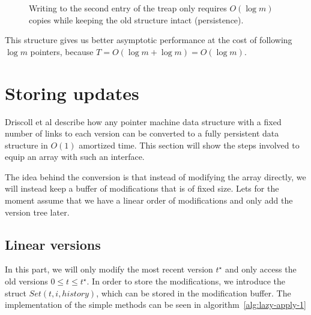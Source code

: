\documentclass[11pt]{Thesis}
\theoremstyle{definition}
\newcommand{\figlabel}[1]{\label{fig:#1}}
\begin{document}
\begin{figure}
\caption[Treap for history storage]{\figlabel{treap}Writing to the second entry of the treap only requires
$O(\log m)$ copies while keeping the old structure intact (persistence).}
\end{figure}

This structure gives us better asymptotic performance at the cost of 
following $\log m$ pointers, because $T = O(\log m + \log m) = O(\log m)$.

\section{Storing updates}
Driscoll et al\cite{Dris89a} describe how any pointer machine data structure 
with a fixed number of links to each version can be converted to a fully 
persistent data structure in $O(1)$ amortized time. This section will show 
the steps involved to equip an array with such an interface.

The idea behind the conversion is that instead of modifying the array 
directly, we will instead keep a buffer of modifications that is of fixed 
size. Lets for the moment assume that we have a linear order of modifications 
and only add the version tree later.

\subsection{Linear versions}
In this part, we will only modify the most recent version $t^\star$ and only 
access the old versions $0 \leq t \leq t^\star$. In order to store the 
modifications, we introduce the struct $Set(t, i, history)$, which can be stored 
in the modification buffer. The implementation of the simple methods can be 
seen in algorithm~\ref{alg:lazy-apply-1}
\end{document}
